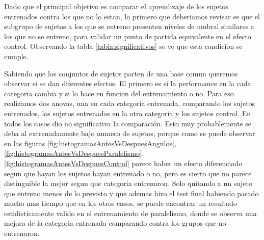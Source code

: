 \documentclass{article}
\begin{document}
Dado que el principal objetivo es comparar el aprendizaje de los sujetos entrenados contra los que no lo estan, lo primero que deberiamos revisar es que el subgrupo de sujetos a los que se entreno presenten niveles de umbral similares a los que no se entreno, para validar un punto de partida equivalente en el efecto control. Observando la tabla \ref{tabla:significativos} se ve que esta condicion se cumple. 

Sabiendo que los conjuntos de sujetos parten de una base comun queremos observar si se dan diferentes efectos. El primero es si la performance en la cada categoria cambia y si lo hace en funcion del entrenamiento o no. Para eso realizamos dos anovas, una en cada categoria entrenada, comparando los sujetos entrenados, los sujetos entrenados en la otra categoria y los sujetos control. En todos los casos dio no significativa la comparación. Esto muy probablemente se deba al extrenadamente bajo numero de sujetos, porque como se puede observar en las figuras \ref{fig:histogramasAntesVsDespuesAngulos}, \ref{fig:histogramasAntesVsDespuesParalelismo}, \ref{fig:histogramasAntesVsDespuesControl} parece haber un efecto diferenciado segun que hayan los sujetos hayan entrenado o no, pero es cierto que no parece distinguible la mejor segun que categoria entrenaron. Solo quitando a un sujeto que entreno menos de lo previsto y que ademas hizo el test final habiendo pasado mucho mas tiempo que en los otros casos, se puede encontrar un resultado estidisticamente valido en el entrenamiento de paralelismo, donde se observa una mejora de la categoria entrenada comparando contra los grupos que no entrenaron. 
\end{document}
